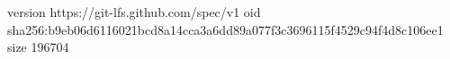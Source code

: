 version https://git-lfs.github.com/spec/v1
oid sha256:b9eb06d6116021bcd8a14cca3a6dd89a077f3c3696115f4529c94f4d8c106ee1
size 196704
